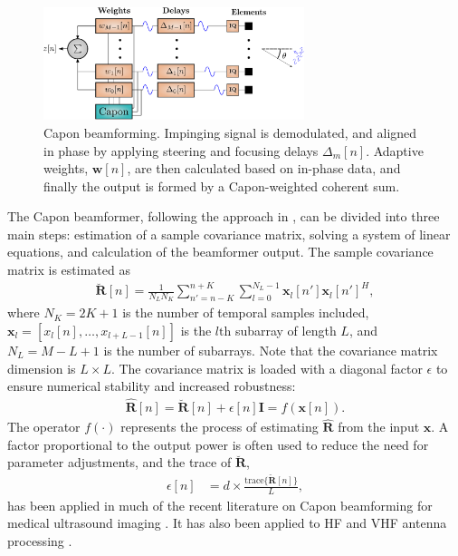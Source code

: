 \documentclass[journal]{IEEEtran}
\newcommand{\mat}[1]{\mathbf{#1}}
\renewcommand{\vec}[1]{\mathbf{#1}}
\begin{document}
\begin{figure}
\centerline{\includegraphics[width=3in]{gfx/beamforming_mv.eps}}
\caption{Capon beamforming. Impinging signal is demodulated, and aligned in phase by applying steering and focusing delays $\Delta_m[n]$. Adaptive weights, $\vec{w}[n]$, are then calculated based on in-phase data, and finally the output is formed by a Capon-weighted coherent sum.}
\label{fig:mvbf}
\end{figure}

The Capon beamformer, following the approach in \cite{Synnevag2009}, can be divided into three main steps: estimation of a sample covariance matrix, solving a system of linear equations, and calculation of the beamformer output.  The sample covariance matrix is estimated as 
\begin{align}
\mat{\breve{R}}[n] = \frac{1}{N_LN_K}\sum_{n'=n-K}^{n+K} \sum_{l=0}^{N_L-1} \vec{x}_l[n']\vec{x}_l[n']^H,\label{eq:R}
\end{align}
where  $N_K = 2K + 1$ is the number of temporal samples included, $\vec{x}_l = [x_l[n], \dotso, x_{l+L-1}[n]]$ is the $l\text{th}$ subarray of length $L$, and $N_L = M-L+1$ is the number of subarrays. Note that the covariance matrix dimension is $L \times L$. The covariance matrix is loaded with a diagonal factor $\epsilon$ to ensure numerical stability and increased robustness: 
\begin{align}\label{eq:diag}
\mat{\hat{R}}[n] = \mat{\breve{R}}[n] + \epsilon[n]\mat{I} = f(\vec{x}[n]).
\end{align}
The operator $f(\cdot)$ represents the process of estimating $\mat{\hat{R}}$ from the input $\vec{x}$.
A factor proportional to the output power is often used to reduce the need for parameter adjustments, and the trace of $\mat{\breve{R}}$, 
\begin{align}\label{eq:diag_adapt}
\epsilon[n] &= d \times \frac{\text{trace}\{\mat{\breve{R}}[n]\}}{L},
\end{align}
has been applied in much of the recent literature on Capon beamforming for medical ultrasound imaging \cite{Synnevag2007, Nilsen2009, Wang2009, Mehdizadeh2012}. It has also been applied to HF and VHF antenna processing \cite{Featherstone1997b}.
\end{document}
